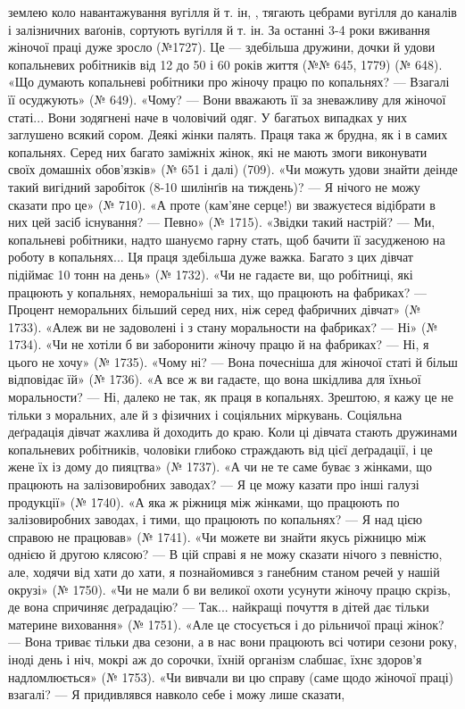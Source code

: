\parcont{}  %
землею коло навантажування вугілля й т. ін, , тягають цебрами
вугілля до каналів і залізничних ваґонів, сортують вугілля й
т. ін. За останні 3-4 роки вживання жіночої праці дуже зросло
(№1727). Це — здебільша дружини, дочки й удови копальневих
робітників від 12 до 50 і 60 років життя (№№ 645, 1779) (№ 648).
«Що думають копальневі робітники про жіночу працю по копальнях?
— Взагалі її осуджують» (№ 649). «Чому? — Вони вважають
її за зневажливу для жіночої статі... Вони зодягнені наче в чоловічий
одяг. У багатьох випадках у них заглушено всякий сором.
Деякі жінки палять. Праця така ж брудна, як і в самих копальнях.
Серед них багато заміжніх жінок, які не мають змоги виконувати
своїх домашніх обов’язків» (№ 651 і далі) (709). «Чи
можуть удови знайти деінде такий вигідний заробіток (8-10
шилінґів на тиждень)? — Я нічого не можу сказати про це»
(№ 710). «А проте (кам’яне серце!) ви зважуєтеся відібрати в
них цей засіб існування? — Певно» (№ 1715). «Звідки такий
настрій? — Ми, копальневі робітники, надто шануємо гарну
стать, щоб бачити її засудженою на роботу в копальнях... Ця
праця здебільша дуже важка. Багато з цих дівчат підіймає
10 тонн на день» (№ 1732). «Чи не гадаєте ви, що робітниці, які
працюють у копальнях, неморальніші за тих, що працюють на
фабриках? — Процент неморальних більший серед них, ніж серед
фабричних дівчат» (№ 1733). «Алеж ви не задоволені і з стану
моральности на фабриках? — Ні» (№ 1734). «Чи не хотіли б ви
заборонити жіночу працю й на фабриках? — Ні, я цього не хочу»
(№ 1735). «Чому ні? — Вона почесніша для жіночої статі й більш
відповідає їй» (№ 1736). «А все ж ви гадаєте, що вона шкідлива
для їхньої моральности? — Ні, далеко не так, як праця в копальнях.
Зрештою, я кажу це не тільки з моральних, але й з фізичних
і соціяльних міркувань. Соціяльна деґрадація дівчат жахлива
й доходить до краю. Коли ці дівчата стають дружинами копальневих
робітників, чоловіки глибоко страждають від цієї деґрадації,
і це жене їх із дому до пияцтва» (№ 1737). «А чи не те саме буває
з жінками, що працюють на залізовиробних заводах? — Я це
можу казати про інші галузі продукції» (№ 1740). «А яка ж ріжниця
між жінками, що працюють по залізовиробних заводах,
і тими, що працюють по копальнях? — Я над цією справою не
працював» (№ 1741). «Чи можете ви знайти якусь ріжницю
між однією й другою клясою? — В цій справі я не можу сказати
нічого з певністю, але, ходячи від хати до хати, я познайомився
з ганебним станом речей у нашій окрузі» (№ 1750). «Чи не мали б
ви великої охоти усунути жіночу працю скрізь, де вона спричиняє
деґрадацію? — Так... найкращі почуття в дітей дає тільки материне
виховання» (№ 1751). «Але це стосується і до рільничої
праці жінок? — Вона триває тільки два сезони, а в нас вони працюють
всі чотири сезони року, іноді день і ніч, мокрі аж до
сорочки, їхній організм слабшає, їхнє здоров’я надломлюється»
(№ 1753). «Чи вивчали ви цю справу (саме щодо жіночої праці)
взагалі? — Я придивлявся навколо себе і можу лише сказати,
\parbreak{}  %
